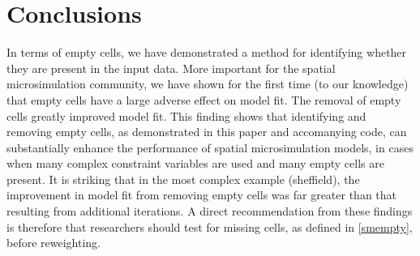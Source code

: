 \documentclass[a4paper,10pt]{article}
\begin{document}
\section{Conclusions}

In terms of empty cells, we have demonstrated a method for identifying
whether they are present in the input data. More important for the spatial microsimulation
community, we have shown for the first time (to our knowledge) that empty cells have a
large adverse effect on model fit. The removal of empty cells greatly improved model fit.
This finding shows that identifying and removing empty cells, as
demonstrated in this paper and accomanying code, can substantially enhance the performance of
spatial microsimulation models, in cases when many complex
constraint variables are used and many empty cells are present.
It is striking that in the most complex example (sheffield), the improvement in
model fit from removing empty cells was far greater than that resulting from
additional iterations.
A direct recommendation from these findings is therefore that researchers should
test for missing cells, as defined in \cref{smempty}, before reweighting. 




% 
% 
% 
% 
%  
% 
% 



\end{document}
